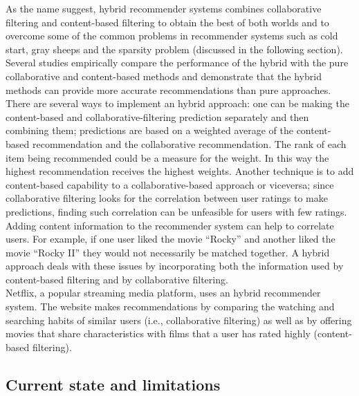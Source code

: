 \documentclass[b5paper,10pt,twoside,cucitura]{toptesi}
\begin{document}
As the name suggest, hybrid recommender systems combines collaborative filtering and content-based filtering to obtain the best of both worlds and to overcome some of the common problems in recommender systems such as cold start, gray sheeps and the sparsity problem (discussed in the following section). Several studies  \citep{hybrid_rs} empirically compare the performance of the hybrid with the pure collaborative and content-based methods and demonstrate that the hybrid methods can provide more accurate recommendations than pure approaches. There are several ways to implement an hybrid approach: one can be making the content-based and collaborative-filtering prediction separately and then combining them; predictions are based on a weighted average of the content-based recommendation and the collaborative recommendation. The rank of each item being recommended could be a measure for the weight. In this way the highest recommendation receives the highest weights. Another technique is to add content-based capability to a collaborative-based approach or viceversa; since collaborative filtering looks for the correlation between user ratings to make predictions, finding such correlation can be unfeasible for users with few ratings. Adding content information to the recommender system can help to correlate users. For example, if one user liked the movie “Rocky” and another liked the movie “Rocky II” they would not necessarily be matched together. A hybrid approach deals with these issues by incorporating both the information used by content-based filtering and by collaborative filtering.
\\
Netflix, a popular streaming media platform, uses an hybrid recommender system. The website makes recommendations by comparing the watching and searching habits of similar users (i.e., collaborative filtering) as well as by offering movies that share characteristics with films that a user has rated highly (content-based filtering).


\subsection{Current state and limitations}
\end{document}
